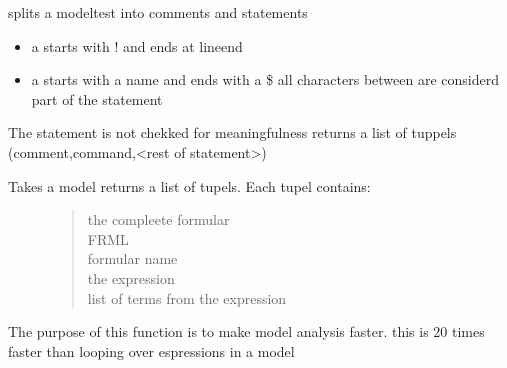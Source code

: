 \documentclass[letterpaper,10pt,english]{sphinxmanual}
\begin{document}
\begin{fulllineitems}
\label{\detokenize{index:modelpattern.find_statements}}
\pysigstartsignatures
{}
\pysigstopsignatures
\sphinxAtStartPar
splits a modeltest into comments and statements
\begin{itemize}
\item {} 
\sphinxAtStartPar
a  starts with ! and ends at lineend

\item {} 
\sphinxAtStartPar
a  starts with a name and ends with a \$ all characters between are considerd part of the statement

\end{itemize}

\sphinxAtStartPar
The statement is not chekked for meaningfulness
returns a list of tuppels (comment,command,\textless{}rest of statement\textgreater{})

\end{fulllineitems}


\begin{fulllineitems}
\label{\detokenize{index:modelpattern.model_parse_old}}
\pysigstartsignatures
{}
\pysigstopsignatures\begin{description}
\item[{Takes a model returns a list of tupels. Each tupel contains:}] \leavevmode\begin{quote}\begin{description}
\item[{the compleete formular}] \leavevmode
\item[{FRML}] \leavevmode
\item[{formular name}] \leavevmode
\item[{the expression}] \leavevmode
\item[{list of terms from the expression}] \leavevmode
\end{description}\end{quote}

\end{description}

\sphinxAtStartPar
The purpose of this function is to make model analysis faster. this is 20 times faster than looping over espressions in a model

\end{fulllineitems}
\end{document}
